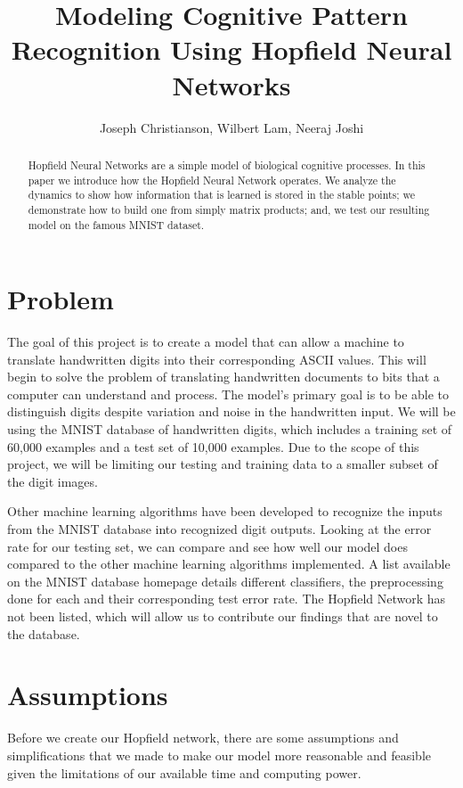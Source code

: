 \documentclass[]{article}
\title{Modeling Cognitive Pattern Recognition Using Hopfield Neural Networks}
\author{Joseph Christianson, Wilbert Lam, Neeraj Joshi}
\theoremstyle{plain}
\theoremstyle{definition}
\begin{document}
\maketitle

\begin{abstract}
Hopfield Neural Networks are a simple model of biological cognitive processes. In this paper we introduce how the Hopfield Neural Network operates. We analyze the dynamics to show how information that is learned is stored in the stable points; we demonstrate how to build one from simply matrix products; and, we test our resulting model on the famous MNIST dataset. 
\end{abstract}

\section{Problem}
The goal of this project is to create a model that can allow a machine to translate handwritten digits into their corresponding ASCII values. This will begin to solve the problem of translating handwritten documents to bits that a computer can understand and process. The model's primary goal is to be able to distinguish digits despite variation and noise in the handwritten input. We will be using the MNIST database of handwritten digits, which includes a training set of 60,000 examples and a test set of 10,000 examples. Due to the scope of this project, we will be limiting our testing and training data to a smaller subset of the digit images. 


Other machine learning algorithms have been developed to recognize the inputs from the MNIST database into recognized digit outputs. Looking at the error rate for our testing set, we can compare and see how well our model does compared to the other machine learning algorithms implemented. A list available on the MNIST database homepage details different classifiers, the preprocessing done for each and their corresponding test error rate. The Hopfield Network has not been listed, which will allow us to contribute our findings that are novel to the database. 

\section{Assumptions}
Before we create our Hopfield network, there are some assumptions and simplifications that we made to make our model more reasonable and feasible given the limitations of our available time and computing power.  
\end{document}
